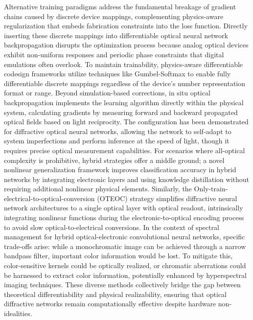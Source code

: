 \documentclass[11pt]{article}
\begin{document}
Alternative training paradigms address the fundamental breakage of gradient chains caused by discrete device mappings, complementing physics-aware regularization that embeds fabrication constraints into the loss function. Directly inserting these discrete mappings into differentiable optical neural network backpropagation disrupts the optimization process because analog optical devices exhibit non-uniform responses and periodic phase constraints that digital emulations often overlook. To maintain trainability, physics-aware differentiable codesign frameworks utilize techniques like Gumbel-Softmax to enable fully differentiable discrete mappings regardless of the device's number representation format or range. Beyond simulation-based corrections, in situ optical backpropagation implements the learning algorithm directly within the physical system, calculating gradients by measuring forward and backward propagated optical fields based on light reciprocity. The configuration has been demonstrated for diffractive optical neural networks, allowing the network to self-adapt to system imperfections and perform inference at the speed of light, though it requires precise optical measurement capabilities. \citep{doi_10_1364_prj_389553_d7a30418} For scenarios where all-optical complexity is prohibitive, hybrid strategies offer a middle ground; a novel nonlinear generalization framework improves classification accuracy in hybrid networks by integrating electronic layers and using knowledge distillation without requiring additional nonlinear physical elements. Similarly, the Only-train-electrical-to-optical-conversion (OTEOC) strategy simplifies diffractive neural network architectures to a single optical layer with optical readout, intrinsically integrating nonlinear functions during the electronic-to-optical encoding process to avoid slow optical-to-electrical conversions. \citep{doi_10_1364_oe_462370_1269b480} In the context of spectral management for hybrid optical-electronic convolutional neural networks, specific trade-offs arise: while a monochromatic image can be achieved through a narrow bandpass filter, important color information would be lost. To mitigate this, color-sensitive kernels could be optically realized, or chromatic aberrations could be harnessed to extract color information, potentially enhanced by hyperspectral imaging techniques. These diverse methods collectively bridge the gap between theoretical differentiability and physical realizability, ensuring that optical diffractive networks remain computationally effective despite hardware non-idealities. \citep{doi_10_1145_3508352_3549378_13c53996} \citep{doi_10_1364_prj_389553_d7a30418} \citep{doi_10_1364_oe_446890_26d35f03} \citep{doi_10_1364_oe_462370_1269b480} \citep{doi_10_1038_s41598_018_30619_y_5f5bfb09}
\end{document}
